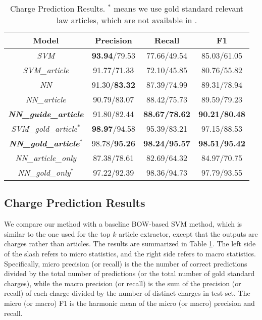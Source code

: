 \begin{table}
\centering
\small{
\begin{tabular}{|c|c|c|c|}
\hline
\textbf{Model}				& \textbf{Precision} 	& \textbf{Recall} 		& \textbf{F1} 	\\
\hline
\textit{SVM} 				& \textbf{93.94}/79.53					& 77.66/49.54  					& 85.03/61.05 				 	\\
\hline
\textit{SVM\_article} 			& 91.77/71.33					& 72.10/45.85  					& 80.76/55.82				 	\\
\hline
\textit{NN}				& 91.30/\textbf{83.32}			& 87.39/74.99  					& 89.31/78.94					\\
\hline
\textit{NN\_article}			& 90.79/83.07					& 88.42/75.73  					& 89.59/79.23					\\
\hline
\textbf{\textit{NN\_guide\_article}} 	& 91.80/82.44 					& \textbf{88.67/78.62} 			& \textbf{90.21/80.48} 		 	\\
\hline
\hline
\textit{SVM\_gold\_article$^*$} 	& \textbf{98.97}/94.58			& 95.39/83.21  					& 97.15/88.53					\\
\hline
\textbf{\textit{NN\_gold\_article$^*$}} 		& 98.78/\textbf{95.26} 			& \textbf{98.24/95.57} 			& \textbf{98.51/95.42} 			\\
\hline
\hline
\textit{NN\_article\_only} 			& 87.38/78.61				& 82.69/64.32				& 84.97/70.75		\\
\hline
\textit{NN\_gold\_only$^*$} 		& 97.22/92.39				& 98.36/94.73				& 97.79/93.55		\\
\hline
\end{tabular}
}
\caption{Charge Prediction Results. $^*$ means we use gold standard relevant law articles, which are not available in .}
\label{tabble_main_results}
\end{table}


\subsection{Charge Prediction Results}
\label{sec_main_results}
We compare our method with a baseline BOW-based SVM method, which is similar to the one used for the top $k$ article extractor, except that the outputs are charges rather than articles. The results are summarized in Table \ref{tabble_main_results}. The left side of the slash refers to micro statistics, and the right side refers to macro statistics. Specifically, micro precision (or recall) is the the number of correct predictions divided by the total number of predictions (or the total number of gold standard charges), while the macro precision (or recall) is the sum of the precision (or recall) of each charge divided by the number of distinct charges in test set. The micro (or macro) F1 is the harmonic mean of the micro (or macro) precision and recall.


